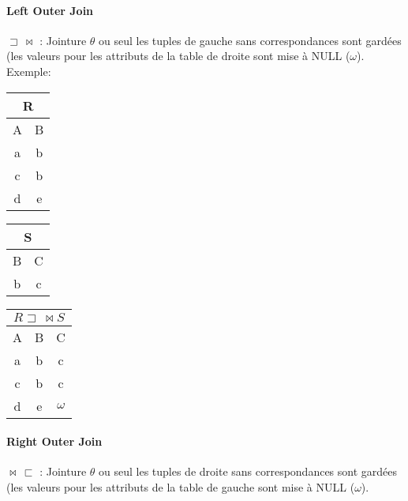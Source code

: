 \documentclass[a4paper]{article}
\begin{document}
  \paragraph{Left Outer Join} $\sqsupset\,\bowtie$ : Jointure $\theta$ ou seul les tuples de gauche sans correspondances
  sont gardées (les valeurs pour les attributs de la table de droite sont mise à NULL ($\omega$).\\
  
    Exemple:
  \begin{tabular}{|c|c|}
	\multicolumn{2}{c}{R}\\
	\hline
	A & B\\
	\hline\hline
	a & b\\
	c & b\\
	d & e\\
	\hline
  \end{tabular}
  \begin{tabular}{|c|c|}
	\multicolumn{2}{c}{S}\\
	\hline
	B & C\\
	\hline\hline
	b & c\\
	\hline
  \end{tabular}
  \begin{tabular}{|c|c|c|}
	\multicolumn{3}{c}{\textcolor[rgb]{1,0,0}{$R \sqsupset\, \bowtie S$}}\\
	\hline
	A & B & C\\
	\hline\hline
	a & b & c\\
	c & b & c\\
	d & e & $\omega$\\
	\hline
  \end{tabular}
  
  \paragraph{Right Outer Join} $\bowtie\,\sqsubset$ : Jointure $\theta$ ou seul les tuples de droite sans correspondances
  sont gardées (les valeurs pour les attributs de la table de gauche sont mise à NULL ($\omega$).\\
  
\end{document}
